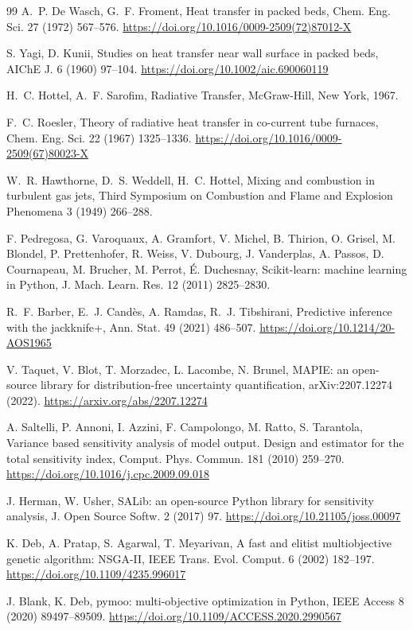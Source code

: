 \documentclass[final,3p,times]{elsarticle}
\begin{document}
\begin{thebibliography}{99}
 A.~P. De Wasch, G.~F. Froment, Heat transfer in packed beds, Chem. Eng. Sci. 27 (1972) 567--576. \url{https://doi.org/10.1016/0009-2509(72)87012-X}

 S. Yagi, D. Kunii, Studies on heat transfer near wall surface in packed beds, AIChE J. 6 (1960) 97--104. \url{https://doi.org/10.1002/aic.690060119}

 H.~C. Hottel, A.~F. Sarofim, Radiative Transfer, McGraw-Hill, New York, 1967.

 F.~C. Roesler, Theory of radiative heat transfer in co-current tube furnaces, Chem. Eng. Sci. 22 (1967) 1325--1336. \url{https://doi.org/10.1016/0009-2509(67)80023-X}

 W.~R. Hawthorne, D.~S. Weddell, H.~C. Hottel, Mixing and combustion in turbulent gas jets, Third Symposium on Combustion and Flame and Explosion Phenomena 3 (1949) 266--288.

 F. Pedregosa, G. Varoquaux, A. Gramfort, V. Michel, B. Thirion, O. Grisel, M. Blondel, P. Prettenhofer, R. Weiss, V. Dubourg, J. Vanderplas, A. Passos, D. Cournapeau, M. Brucher, M. Perrot, \'E. Duchesnay, Scikit-learn: machine learning in Python, J. Mach. Learn. Res. 12 (2011) 2825--2830.

 R.~F. Barber, E.~J. Cand\`es, A. Ramdas, R.~J. Tibshirani, Predictive inference with the jackknife+, Ann. Stat. 49 (2021) 486--507. \url{https://doi.org/10.1214/20-AOS1965}

 V. Taquet, V. Blot, T. Morzadec, L. Lacombe, N. Brunel, MAPIE: an open-source library for distribution-free uncertainty quantification, arXiv:2207.12274 (2022). \url{https://arxiv.org/abs/2207.12274}

 A. Saltelli, P. Annoni, I. Azzini, F. Campolongo, M. Ratto, S. Tarantola, Variance based sensitivity analysis of model output. Design and estimator for the total sensitivity index, Comput. Phys. Commun. 181 (2010) 259--270. \url{https://doi.org/10.1016/j.cpc.2009.09.018}

 J. Herman, W. Usher, SALib: an open-source Python library for sensitivity analysis, J. Open Source Softw. 2 (2017) 97. \url{https://doi.org/10.21105/joss.00097}

 K. Deb, A. Pratap, S. Agarwal, T. Meyarivan, A fast and elitist multiobjective genetic algorithm: NSGA-II, IEEE Trans. Evol. Comput. 6 (2002) 182--197. \url{https://doi.org/10.1109/4235.996017}

 J. Blank, K. Deb, pymoo: multi-objective optimization in Python, IEEE Access 8 (2020) 89497--89509. \url{https://doi.org/10.1109/ACCESS.2020.2990567}

\end{thebibliography}
\end{document}

